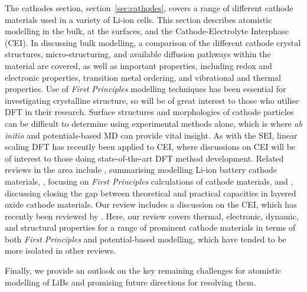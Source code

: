 \documentclass[../main.tex]{subfiles}
\begin{document}
The cathodes section, section~\ref{sec:cathodes}, covers a range of different cathode materials used in a variety of Li-ion cells. This section describes atomistic modelling in the bulk, at the surfaces, and the Cathode-Electrolyte Interphase (CEI). In discussing bulk modelling, a comparison of the different cathode crystal structures, micro-structuring, and available diffusion pathways within the material are covered, as well as important properties, including redox and electronic properties, transition metal ordering, and vibrational and thermal properties. Use of \textit{First Principles} modelling techniques has been essential for investigating crystalline structure, so will be of great interest to those who utilise DFT in their research. Surface structures and morphologies of cathode particles can be difficult to determine using experimental methods alone, which is where \textit{ab initio} and potentials-based MD can provide vital insight. As with the SEI, linear scaling DFT has recently been applied to CEI, where discussions on CEI will be of interest to those doing state-of-the-art DFT method development. Related reviews in the area include \citeauthor{ma2018computer}, \cite{ma2018computer} summarising modelling Li-ion battery cathode materials, \citeauthor{yan2014review}, \cite{yan2014review} focusing on \textit{First Principles} calculations of cathode materials, and \citeauthor{wang2018reviving}, \cite{wang2018reviving} discussing closing the gap between theoretical and practical capacities in layered oxide cathode materials. Our review includes a discussion on the CEI, which has recently been reviewed by \citeauthor{maleki2019controllable}. \cite{maleki2019controllable} Here, our review covers thermal, electronic, dynamic, and structural properties for a range of prominent cathode materials in terms of both \textit{First Principles} and potential-based modelling, which have tended to be more isolated in other reviews.

Finally, we provide an outlook on the key remaining challenges for atomistic modelling of LiBs and promising future directions for resolving them.
\end{document}
